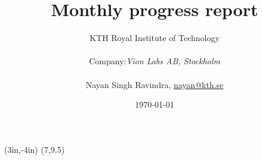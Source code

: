 \documentclass[12pt]{article}
\title{Monthly progress report\\ }
\author{ KTH Royal Institute of Technology\\\\
         Company:{\it  Vion Labs AB, Stockholm} 
	\\\\Nayan Singh Ravindra, \hyperlink{mailto:nayan@kth.se}{nayan@kth.se}}
\date{\today}
\begin{document}
	\thisfancyput(3in,-4in){%
		\setlength{\unitlength}{1in}\fancyoval(7,9.5)}%
	
	\maketitle
	\pagebreak
	
	
\end{document}
